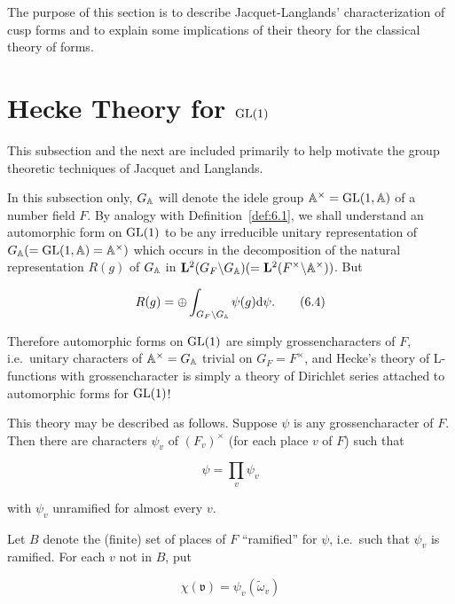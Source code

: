 The purpose of this section is to describe Jacquet-Langlands' characterization of cusp forms and to explain some implications of their theory for the classical theory of forms.

\section{Hecke Theory for \texorpdfstring{$\operatorname{GL}(1)$}{GL(1)}}\label{sec:6a}

This subsection and the next are included primarily to help motivate the group theoretic techniques of Jacquet and Langlands.

In this subsection only, $G_{\mathbb{A}}$ will denote the idele group $\mathbb{A}^{\times} = \operatorname{GL}(1,\mathbb{A})$ of a number field $F$. By analogy with Definition~\ref{def:6.1}, we shall understand an automorphic form on $\operatorname{GL}(1)$ to be any irreducible unitary representation of $G_{\mathbb{A}} (= \operatorname{GL}(1,\mathbb{A}) = \mathbb{A}^{\times})$ which occurs in the decomposition of the natural representation $R(g)$ of $G_{\mathbb{A}}$ in $\mathbf{L}^2(G_F \backslash G_{\mathbb{A}}) (= \mathbf{L}^2(F^{\times} \backslash \mathbb{A}^{\times}))$. But

\begin{equation}\label{eq:6.4}
R(g) = \oplus \int_{G_F \backslash G_{\mathbb{A}}} \psi(g) \mathrm{d} \psi.\tag{6.4}
\end{equation}

Therefore automorphic forms on $\operatorname{GL}(1)$ are simply grossencharacters of $F$, i.e.\ unitary characters of $\mathbb{A}^{\times} = G_{\mathbb{A}}$ trivial on $G_F = F^{\times}$, and Hecke's theory of L-functions with grossencharacter is simply a theory of Dirichlet series attached to automorphic forms for $\operatorname{GL}(1)$!

This theory may be described as follows. Suppose $\psi$ is any grossencharacter of $F$. Then there are characters $\psi_v$ of $(F_v)^{\times}$ (for each place $v$ of $F$) such that

\begin{equation}\label{eq:6.5}
\psi = \prod_v \psi_v\tag{6.5}
\end{equation}

with $\psi_v$ unramified for almost every $v$.

Let $B$ denote the (finite) set of places of $F$ ``ramified'' for $\psi$, i.e.\ such that $\psi_v$ is ramified. For each $v$ not in $B$, put

\begin{equation}\label{eq:6.6}
\chi(\mathfrak{v}) = \psi_v(\tilde{\omega}_v)\tag{6.6}
\end{equation}

